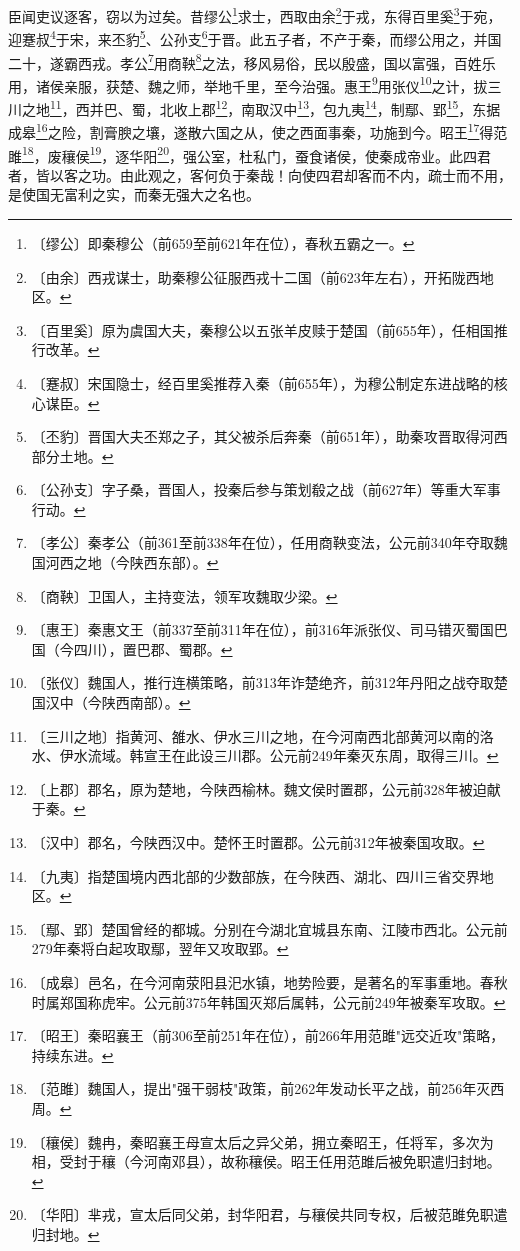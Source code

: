 \documentclass[12pt,UTF-8,openany,a4]{ctexbook}
\begin{document}
\begin{large}
    
    臣闻吏议逐客，窃以为过矣。昔缪公\footnote{〔缪公〕\yiwen 即秦穆公（前659至前621年在位），春秋五霸之一。}求士，西取由余\footnote{〔由余〕\yiwen 西戎谋士，助秦穆公征服西戎十二国（前623年左右），开拓陇西地区。}于戎，东得百里奚\footnote{〔百里奚〕\yiwen 原为虞国大夫，秦穆公以五张羊皮赎于楚国（前655年），任相国推行改革。}于宛，迎蹇叔\footnote{〔蹇叔〕\yiwen 宋国隐士，经百里奚推荐入秦（前655年），为穆公制定东进战略的核心谋臣。}于宋，来丕豹\footnote{〔丕豹〕\yiwen 晋国大夫丕郑之子，其父被杀后奔秦（前651年），助秦攻晋取得河西部分土地。}、公孙支\footnote{〔公孙支〕\yiwen 字子桑，晋国人，投秦后参与策划殽之战（前627年）等重大军事行动。}于晋。此五子者，不产于秦，而缪公用之，并国二十，遂霸西戎。孝公\footnote{〔孝公〕\yiwen 秦孝公（前361至前338年在位），任用商鞅变法，公元前340年夺取魏国河西之地（今陕西东部）。}用商鞅\footnote{〔商鞅〕\yiwen 卫国人，主持变法，领军攻魏取少梁。}之法，移风易俗，民以殷盛，国以富强，百姓乐用，诸侯亲服，获楚、魏之师，举地千里，至今治强。惠王\footnote{〔惠王〕\yiwen 秦惠文王（前337至前311年在位），前316年派张仪、司马错灭蜀国巴国（今四川），置巴郡、蜀郡。}用张仪\footnote{〔张仪〕\yiwen 魏国人，推行连横策略，前313年诈楚绝齐，前312年丹阳之战夺取楚国汉中（今陕西南部）。}之计，拔三川之地\footnote{〔三川之地〕\yiwen 指黄河、雒水、伊水三川之地，在今河南西北部黄河以南的洛水、伊水流域。韩宣王在此设三川郡。公元前249年秦灭东周，取得三川。}，西并巴、蜀，北收上郡\footnote{〔上郡〕\yiwen 郡名，原为楚地，今陕西榆林。魏文侯时置郡，公元前328年被迫献于秦。}，南取汉中\footnote{〔汉中〕\yiwen 郡名，今陕西汉中。楚怀王时置郡。公元前312年被秦国攻取。}，包九夷\footnote{〔九夷〕\yiwen 指楚国境内西北部的少数部族，在今陕西、湖北、四川三省交界地区。}，制鄢、郢\footnote{〔鄢、郢〕\yiwen 楚国曾经的都城。分别在今湖北宜城县东南、江陵市西北。公元前279年秦将白起攻取鄢，翌年又攻取郢。}，东据成皋\footnote{〔成皋〕\yiwen 邑名，在今河南荥阳县汜水镇，地势险要，是著名的军事重地。春秋时属郑国称虎牢。公元前375年韩国灭郑后属韩，公元前249年被秦军攻取。}之险，割膏腴之壤，遂散六国之从，使之西面事秦，功施到今。昭王\footnote{〔昭王〕\yiwen 秦昭襄王（前306至前251年在位），前266年用范雎"远交近攻"策略，持续东进。}得范雎\footnote{〔范雎〕\yiwen 魏国人，提出"强干弱枝"政策，前262年发动长平之战，前256年灭西周。}，废穰侯\footnote{〔穰侯〕\yiwen 魏冉，秦昭襄王母宣太后之异父弟，拥立秦昭王，任将军，多次为相，受封于穰（今河南邓县），故称穰侯。昭王任用范雎后被免职遣归封地。}，逐华阳\footnote{〔华阳〕\yiwen 芈戎，宣太后同父弟，封华阳君，与穰侯共同专权，后被范雎免职遣归封地。}，强公室，杜私门，蚕食诸侯，使秦成帝业。此四君者，皆以客之功。由此观之，客何负于秦哉！向使四君却客而不内，疏士而不用，是使国无富利之实，而秦无强大之名也。
    

\end{large}
\end{document}
